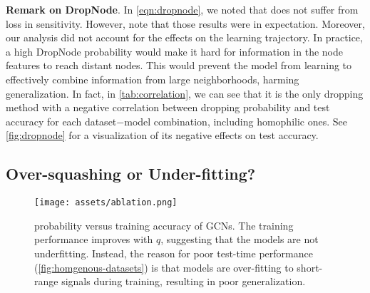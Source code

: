 \textbf{Remark on DropNode}. In \autoref{eqn:dropnode}, we noted that  does not suffer from loss in sensitivity. However, note that those results were in expectation. Moreover, our analysis did not account for the effects on the learning trajectory. In practice, a high DropNode probability would make it hard for information in the node features to reach distant nodes. This would prevent the model from learning to effectively combine information from large neighborhoods, harming generalization. In fact, in \autoref{tab:correlation}, we can see that it is the only dropping method with a negative correlation between dropping probability and test accuracy for each dataset$-$model combination, including homophilic ones. See \autoref{fig:dropnode} for a visualization of its negative effects on test accuracy.


\subsection{Over-squashing or Under-fitting?}

\begin{figure}
    \centering
    \texttt{[image: assets/ablation.png]}
    \caption{ probability versus training accuracy of GCNs. The training performance improves with $q$, suggesting that the models are not underfitting. Instead, the reason for poor test-time performance (\autoref{fig:homgenous-datasets}) is that models are over-fitting to short-range signals during training, resulting in poor generalization.}
    \label{fig:ablation}
\end{figure}

